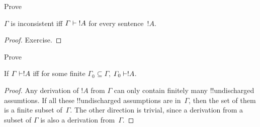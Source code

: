 \documentclass[../../../include/open-logic-section]{subfiles}
\begin{document}
\begin{prob}
Prove 
\end{prob}

\begin{prop}
$\Gamma$ is inconsistent iff $\Gamma \Proves {!A}$ for every
  sentence~$!A$.
\end{prop}

\begin{proof}
Exercise.
\end{proof}

\begin{prob}
Prove 
\end{prob}

\begin{prop}
If $\Gamma \Proves !A$ iff for some finite $\Gamma_0 \subseteq
\Gamma$, $\Gamma_0 \Proves !A$.
\end{prop}

\begin{proof}
Any derivation of $!A$ from $\Gamma$ can only contain finitely many
!!{undischarged} assumtions.  If all these !!{undischarged} assumptions are
in~$\Gamma$, then the set of them is a finite subset of~$\Gamma$.  The
other direction is trivial, since a derivation from a subset of
$\Gamma$ is also a derivation from~$\Gamma$.
\end{proof}
\end{document}
